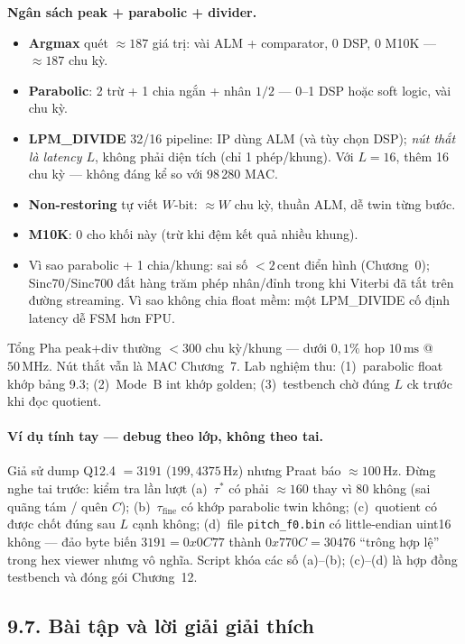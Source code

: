 \begin{costbox}
\textbf{Ngân sách peak + parabolic + divider.}
\begin{itemize}[leftmargin=1.2em]
\item \textbf{Argmax} quét $\approx 187$ giá trị: vài ALM + comparator, 0 DSP, 0 M10K --- $\approx 187$ chu kỳ.
\item \textbf{Parabolic}: 2 trừ + 1 chia ngắn + nhân $1/2$ --- 0--1 DSP hoặc soft logic, vài chu kỳ.
\item \textbf{LPM\_DIVIDE} 32/16 pipeline: IP dùng ALM (và tùy chọn DSP); \emph{nút thắt là latency $L$}, không phải diện tích (chỉ 1 phép/khung). Với $L=16$, thêm 16 chu kỳ --- không đáng kể so với 98\,280 MAC.
\item \textbf{Non-restoring} tự viết $W$-bit: $\approx W$ chu kỳ, thuần ALM, dễ twin từng bước.
\item \textbf{M10K}: 0 cho khối này (trừ khi đệm kết quả nhiều khung).
\item Vì sao parabolic + 1 chia/khung: sai số $< 2\,\text{cent}$ điển hình (Chương~0); Sinc70/Sinc700 đắt hàng trăm phép nhân/đỉnh trong khi Viterbi đã tắt trên đường streaming. Vì sao không chia float mềm: một LPM\_DIVIDE cố định latency dễ FSM hơn FPU.
\end{itemize}
\end{costbox}

Tổng Pha peak+div thường $<300$ chu kỳ/khung --- dưới $0{,}1\%$ hop $10\,\text{ms}$ @ $50\,\text{MHz}$. Nút thắt vẫn là MAC Chương~7. Lab nghiệm thu: (1)~parabolic float khớp bảng 9.3; (2)~Mode~B int khớp golden; (3)~testbench chờ đúng $L$ ck trước khi đọc quotient.

\paragraph{Ví dụ tính tay --- debug theo lớp, không theo tai.}
Giả sử dump Q12.4 $=3191$ ($199{,}4375\,\text{Hz}$) nhưng Praat báo $\approx 100\,\text{Hz}$. Đừng nghe tai trước: kiểm tra lần lượt (a)~$\tau^*$ có phải $\approx 160$ thay vì $80$ không (sai quãng tám / quên $C$); (b)~$\tau_{\mathrm{fine}}$ có khớp parabolic twin không; (c)~quotient có được chốt đúng sau $L$ cạnh không; (d)~file \texttt{pitch\_f0.bin} có little-endian uint16 không --- đảo byte biến $3191=0x0C77$ thành $0x770C=30476$ ``trông hợp lệ'' trong hex viewer nhưng vô nghĩa. Script khóa các số (a)--(b); (c)--(d) là hợp đồng testbench và đóng gói Chương~12.

\subsection*{9.7. Bài tập và lời giải giải thích}

